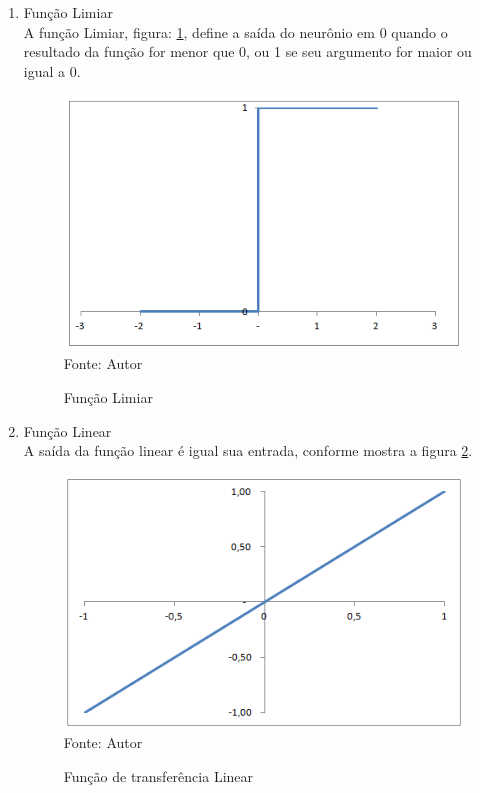 \documentclass[
	12pt,				%
    oneside,			%
	a4paper,			%
	english,			%
	french,				%
	spanish,			%
	brazil,				%
	]{abntex2}
\begin{document}
\begin{enumerate}
  \item Função Limiar\\
  A função Limiar, figura: \ref{fig:Hard_limit1}, define a saída do neurônio em 0 quando o resultado da função for menor que 0, ou 1 se seu argumento for maior ou igual a 0.
  
  \begin{figure}[H]
    \centering
    \caption{Função Limiar}
    \includegraphics[scale=0.75]{Hard_limit1}\\
    Fonte: Autor\hfill
    \label{fig:Hard_limit1}
  \end{figure}
  
  
  \item Função Linear\\
  A saída da função linear é igual sua entrada, conforme mostra a figura \ref{fig:Linear}.
  
  \begin{figure}[H]
    \centering
    \caption{Função de transferência Linear}
    \includegraphics[scale=0.75]{Linear1}\\
    Fonte: Autor\hfill
    \label{fig:Linear}
  \end{figure}
  

\end{enumerate}
\end{document}
